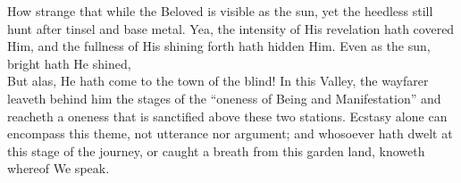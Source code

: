 \documentclass[12pt]{article}
\begin{document}
\vspace{2ex}
 {
How strange that while the Beloved is visible as the sun, yet the heedless still hunt after tinsel and base metal.
}
\vspace{2ex}
 {
Yea, the intensity of His revelation hath covered Him, and the fullness of His shining forth hath hidden Him.
}
\vspace{2ex}
 {
Even as the sun, bright hath He shined, \\
But alas, He hath come to the town of the blind!\footnotemark[16]
}
\vspace{2ex}
 {
In this Valley, the wayfarer leaveth behind him the stages of the ``oneness of Being and Manifestation''\footnotemark[47]
}
\vspace{2ex}
 {
and reacheth a oneness that is sanctified above these two stations.
}
\vspace{2ex}
 {
Ecstasy alone can encompass this theme, not utterance nor argument;
}
\vspace{2ex}
 {
and whosoever hath dwelt at this stage of the journey, or caught a breath from this garden land, knoweth whereof We speak.
}
\end{document}
